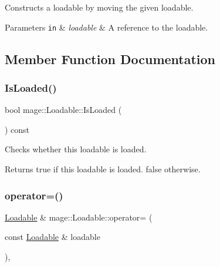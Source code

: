 Constructs a loadable by moving the given loadable.


\begin{DoxyParams}[1]{Parameters}
\mbox{\tt in}  & {\em loadable} & A reference to the loadable. \\
\hline
\end{DoxyParams}


\subsection{Member Function Documentation}
\hypertarget{classmage_1_1_loadable_a53cfa5beb9b44bbcda0d6166a54b8cb6}{}\label{classmage_1_1_loadable_a53cfa5beb9b44bbcda0d6166a54b8cb6} 
\subsubsection{\texorpdfstring{Is\+Loaded()}{IsLoaded()}}
{\footnotesize\ttfamily bool mage\+::\+Loadable\+::\+Is\+Loaded (\begin{DoxyParamCaption}{ }\end{DoxyParamCaption}) const}

Checks whether this loadable is loaded.

\begin{DoxyReturn}{Returns}
{\ttfamily true} if this loadable is loaded. {\ttfamily false} otherwise. 
\end{DoxyReturn}
\hypertarget{classmage_1_1_loadable_a4a082e96811229b3869c03f964b5742d}{}\label{classmage_1_1_loadable_a4a082e96811229b3869c03f964b5742d} 
\subsubsection{\texorpdfstring{operator=()}{operator=()}\hspace{0.1cm}{\footnotesize\ttfamily [1/2]}}
{\footnotesize\ttfamily \hyperlink{classmage_1_1_loadable}{Loadable} \& mage\+::\+Loadable\+::operator= (\begin{DoxyParamCaption}\item[{const \hyperlink{classmage_1_1_loadable}{Loadable} \&}]{loadable }\end{DoxyParamCaption})\hspace{0.3cm}{\ttfamily [protected]}, {\ttfamily [default]}}

